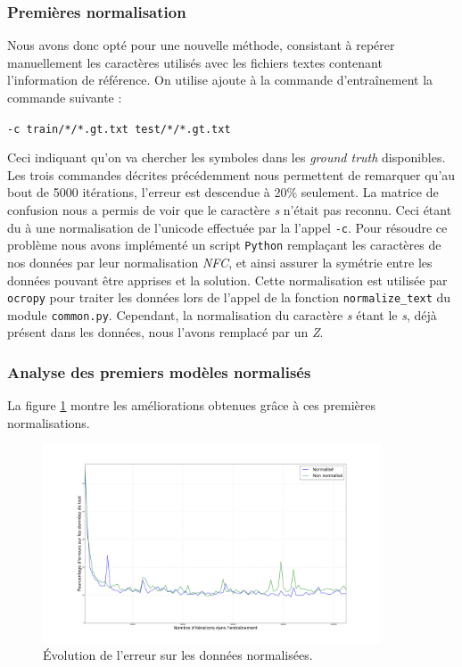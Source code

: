 \documentclass{report}
\newenvironment{oldstyle}{%
    \renewcommand\rmdefault{jkplvos}%
  \renewcommand\sfdefault{jkpssvos}%
  \renewcommand\ttdefault{jkpttvos}%
  \normalfont
}{}
\newcommand\s{\begin{oldstyle}s\end{oldstyle}}
\begin{document}
\subsubsection{Premières normalisation}

Nous avons donc opté pour une nouvelle méthode, consistant à repérer manuellement les caractères utilisés avec les fichiers textes contenant l'information de référence.
On utilise ajoute à la commande d'entraînement la commande suivante :

\begin{center}
    \texttt{-c train/*/*.gt.txt test/*/*.gt.txt}
\end{center}

Ceci indiquant qu'on va chercher les symboles dans les \textit{ground truth} disponibles.
Les trois commandes décrites précédemment nous permettent de remarquer qu'au bout de 5000 itérations, l'erreur est descendue à 20\% seulement.
La matrice de confusion nous a permis de voir que le caractère \textit{\s} n'était pas reconnu.
Ceci étant du à une normalisation de l'unicode effectuée par la l'appel \texttt{-c}.
Pour résoudre ce problème nous avons implémenté un script \texttt{Python} remplaçant les caractères de nos données par leur normalisation \textit{NFC}, et ainsi assurer la symétrie entre les données pouvant être apprises et la solution.
Cette normalisation est utilisée par \texttt{ocropy} pour traiter les données lors de l'appel de la fonction \texttt{normalize\_text} du module \texttt{common.py}.
Cependant, la normalisation du caractère \textit{\s} étant le \textit{s}, déjà présent dans les données, nous l'avons remplacé par un \textit{Z}.

\subsubsection{Analyse des premiers modèles normalisés}

La figure \ref{err_norm} montre les améliorations obtenues grâce à ces premières normalisations.

\begin{figure}[!h] 
    \center
    \includegraphics[width=10cm]{error_plot_norm.png}
    \caption{Évolution de l'erreur sur les données normalisées.}
    \label{err_norm}
\end{figure}
\end{document}
